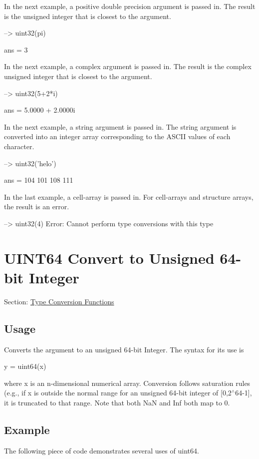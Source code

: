 In the next example, a positive double precision argument is passed in. The result is the unsigned integer that is closest to the argument.


\begin{DoxyVerbInclude}
--> uint32(pi)

ans = 
 3 
\end{DoxyVerbInclude}


In the next example, a complex argument is passed in. The result is the complex unsigned integer that is closest to the argument.


\begin{DoxyVerbInclude}
--> uint32(5+2*i)

ans = 
   5.0000 +  2.0000i 
\end{DoxyVerbInclude}


In the next example, a string argument is passed in. The string argument is converted into an integer array corresponding to the A\-S\-C\-I\-I values of each character.


\begin{DoxyVerbInclude}
--> uint32('helo')

ans = 
 104 101 108 111 
\end{DoxyVerbInclude}


In the last example, a cell-\/array is passed in. For cell-\/arrays and structure arrays, the result is an error.


\begin{DoxyVerbInclude}
--> uint32({4})
Error: Cannot perform type conversions with this type
\end{DoxyVerbInclude}
 \hypertarget{typecast_uint64}{}\section{U\-I\-N\-T64 Convert to Unsigned 64-\/bit Integer}\label{typecast_uint64}
Section\-: \hyperlink{sec_typecast}{Type Conversion Functions} \hypertarget{vtkwidgets_vtkxyplotwidget_Usage}{}\subsection{Usage}\label{vtkwidgets_vtkxyplotwidget_Usage}
Converts the argument to an unsigned 64-\/bit Integer. The syntax for its use is \begin{DoxyVerb}   y = uint64(x)
\end{DoxyVerb}
 where {\ttfamily x} is an {\ttfamily n}-\/dimensional numerical array. Conversion follows saturation rules (e.\-g., if {\ttfamily x} is outside the normal range for an unsigned 64-\/bit integer of {\ttfamily \mbox{[}0,2$^\wedge$64-\/1\mbox{]}}, it is truncated to that range. Note that both {\ttfamily Na\-N} and {\ttfamily Inf} both map to 0. \hypertarget{variables_struct_Example}{}\subsection{Example}\label{variables_struct_Example}
The following piece of code demonstrates several uses of {\ttfamily uint64}.


